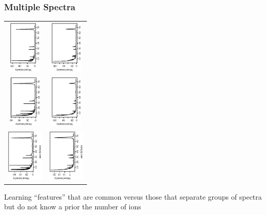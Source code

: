 \documentclass[]{beamer}
\newcommand{\bs}[2]{\begin{frame} \frametitle{#1}
{#2}
\end{frame} }
\begin{document}
\bs{Multiple Spectra} {
\begin{center}
\begin{tabular}{cc}
\includegraphics[height=1in,angle=-90]{RawSpecCont_n4_allFrcAvg_22.ps}&
\includegraphics[height=1in,angle=-90]{RawSpecDis_n15_allFrcAvg_22.ps}\vspace{-.2in}\\
\includegraphics[height=1in,angle=-90]{RawSpecCont_n2_allFrcAvg_22.ps}&
\includegraphics[height=1in,angle=-90]{RawSpecDis_n14_allFrcAvg_22.ps}\vspace{-.2in}\\
\includegraphics[height=1in,angle=-90]{RawSpecCont_n1_allFrcAvg_22.ps}&
\includegraphics[height=1in,angle=-90]{RawSpecDis_n11_allFrcAvg_22.ps}
\end{tabular}
\end{center}

Learning ``features'' that are common versus those that separate
groups of  spectra but do not know a prior the number of ions
}
\end{document}
